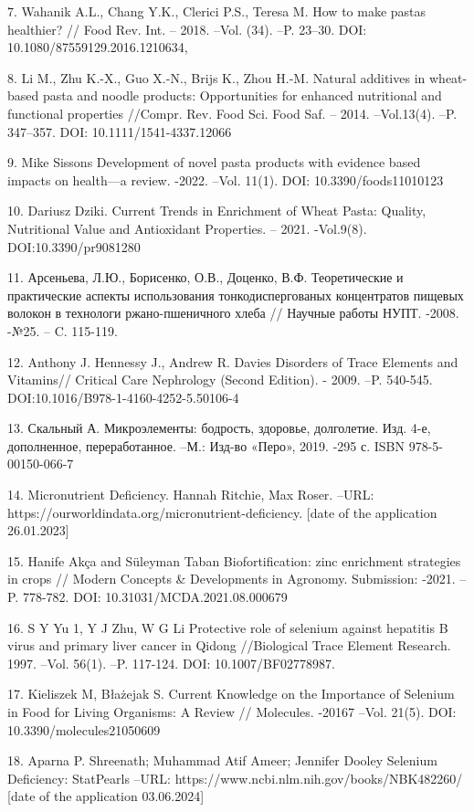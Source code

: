 7. Wahanik A.L., Chang Y.K., Clerici P.S., Teresa M. How to make pastas
healthier? // Food Rev. Int. -- 2018. --Vol. (34). --P. 23--30. DOI:
10.1080/87559129.2016.1210634,

8. Li M., Zhu K.-X., Guo X.-N., Brijs K., Zhou H.-M. Natural additives
in wheat-based pasta and noodle products: Opportunities for enhanced
nutritional and functional properties //Compr. Rev. Food Sci. Food Saf.
-- 2014. --Vol.13(4). --P. 347--357. DOI: 10.1111/1541-4337.12066

9. Mike Sissons Development of novel pasta products with evidence based
impacts on health---a review. -2022. --Vol. 11(1). DOI:
10.3390/foods11010123

10. Dariusz Dziki. Current Trends in Enrichment of Wheat Pasta: Quality,
Nutritional Value and Antioxidant Properties. -- 2021. -Vol.9(8).
DOI:10.3390/pr9081280

11. Арсеньева, Л.Ю., Борисенко, О.В., Доценко, В.Ф. Теоретические и
практические аспекты использования тонкодиспергованых концентратов
пищевых волокон в технологи ржано-пшеничного хлеба // Научные работы
НУПТ. -2008. -№25. -- C. 115-119.

12. Anthony J. Hennessy J., Andrew R. Davies Disorders of Trace Elements
and Vitamins// Critical Care Nephrology (Second Edition). - 2009. --P.
540-545. DOI:10.1016/B978-1-4160-4252-5.50106-4

13. Скальный А. Микроэлементы: бодрость, здоровье, долголетие. Изд. 4-е,
дополненное, переработанное. --М.: Изд-во «Перо», 2019. -295 с. ISBN
978-5-00150-066-7

14. Micronutrient Deficiency. Hannah Ritchie, Max Roser. --URL:
https://ourworldindata.org/micronutrient-deficiency. {[}date of the
application 26.01.2023{]}

15. Hanife Akça and Süleyman Taban Biofortification: zinc enrichment
strategies in crops // Modern Concepts \& Developments in Agronomy.
Submission: -2021. --P. 778-782. DOI: 10.31031/MCDA.2021.08.000679

16. S Y Yu 1, Y J Zhu, W G Li Protective role of selenium against
hepatitis B virus and primary liver cancer in Qidong //Biological Trace
Element Research. 1997. --Vol. 56(1). --P. 117-124. DOI:
10.1007/BF02778987.

17. Kieliszek M, Błażejak S. Current Knowledge on the Importance of
Selenium in Food for Living Organisms: A Review // Molecules. -20167
--Vol. 21(5). DOI: 10.3390/molecules21050609

18. Aparna P. Shreenath; Muhammad Atif Ameer; Jennifer Dooley Selenium
Deficiency: StatPearls --URL:
https://www.ncbi.nlm.nih.gov/books/NBK482260/ {[}date of the application
03.06.2024{]}

